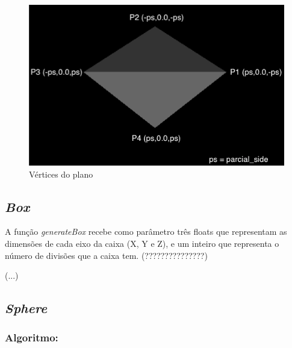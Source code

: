 \documentclass[a4paper]{article}
\begin{document}
\begin{figure}[H]
\centering
\includegraphics[scale=0.50]{plane.png}
\caption{Vértices do plano}
\label{img:glulookat}
\end{figure}

\newpage

\subsection{\textit{Box}}
\label{sec:box}
A função \textit{generateBox} recebe como parâmetro três floats que representam as dimensões de cada eixo da caixa (X, Y e Z), e um inteiro que representa o número de divisões que a caixa tem. (???????????????)

(...)

\subsection{\textit{Sphere}}
\label{sec:sphere}

\subsubsection{Algoritmo:}
\end{document}
